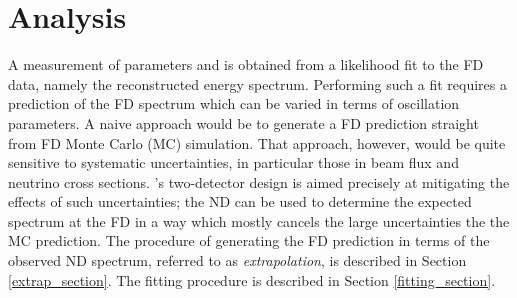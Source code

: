 \chapter{Analysis}
\label{analysis_chapter}

A measurement of parameters \deltamtht and \thetatth is obtained from
a likelihood fit to the FD data, namely the reconstructed energy spectrum.
Performing such a fit requires a prediction of the FD spectrum which can be
varied in terms of oscillation parameters.
A naive approach would be to generate a FD prediction straight from
FD Monte Carlo (MC) simulation.
That approach, however, would be quite sensitive to systematic uncertainties,
in particular those in \numi beam flux and neutrino cross sections.
\nova's two-detector design is aimed precisely at mitigating the effects of
such uncertainties; the ND can be used to determine the expected
spectrum at the FD in a way which mostly cancels the large uncertainties the
the MC prediction.
The procedure of generating the FD prediction in terms of the observed
ND spectrum, referred to as \textit{extrapolation}, is described in Section
\ref{extrap_section}.
The fitting procedure is described in Section \ref{fitting_section}.

